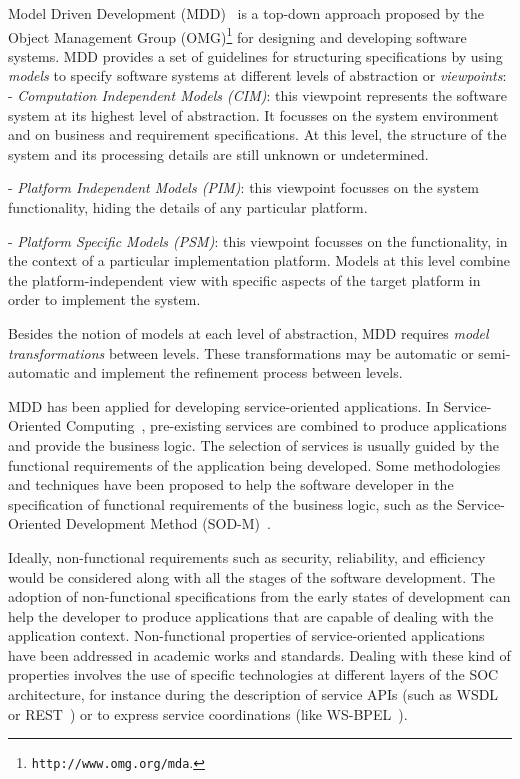 Model Driven Development (MDD)~\cite{Favre06arigorous} is a top-down approach proposed by the Object Management Group
(OMG)\footnote{\texttt{http://www.omg.org/mda}.} for designing and developing software systems.
MDD provides a set of guidelines for  structuring  specifications by using \textit{models} to specify software systems at different levels of abstraction or \textit{viewpoints}:\\[1mm]
\noindent
- \textit{Computation Independent Models (CIM)}: this viewpoint represents the software system at its highest level of abstraction. It focusses on the system
environment and on  business and requirement specifications.
At this level, the structure of the system  and its processing details are still unknown or undetermined.

\noindent
- \textit{Platform Independent Models (PIM)}: this viewpoint focusses on the system functionality, hiding the details of any particular platform.

\noindent
- \textit{Platform Specific Models (PSM)}: this viewpoint focusses on the functionality, in the context of a particular implementation platform.
Models at this level combine the platform-independent view with specific aspects of the target platform in order to implement the system.

Besides the notion of models at each level of abstraction, MDD requires  \textit{model transformations} between levels.
These transformations may be automatic or semi-automatic and implement the refinement process between levels.

MDD has been applied for developing service-oriented applications.
In Service-Oriented Computing~\cite{scube2010book}, pre-existing services are
combined to produce applications and provide the business logic. The selection of services is usually guided by the functional requirements of the application being developed.
Some methodologies and techniques have been proposed to help the software
developer in the specification of functional requirements of the business logic,
such as the Service-Oriented Development Method
(SOD-M)~\cite{decastro1}.

Ideally, non-functional requirements such as
security, reliability, and efficiency
would be considered along with all the stages of the software development. The
adoption of non-functional specifications from the early states of development
can help the developer to produce applications that are capable of dealing with
the application context.
%
%
Non-functional properties of service-oriented applications  have been
addressed in academic works and standards. %
Dealing with these kind of properties involves the use of specific technologies
at different layers of the SOC architecture, for instance during the description
of service APIs (such as WSDL\cite{wsdl} or REST~\cite{rest}) or to express
service coordinations (like WS-BPEL~\cite{bpel03}).

